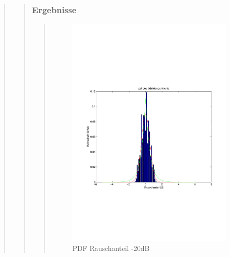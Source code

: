 \begin{quote}
\begin{quote}
        \subsubsection{Ergebnisse}
		\begin{quote}
		
		\begin{figure}[H]
        \centering
            \includegraphics[scale=0.6, trim = 1cm 6.5cm 1cm 7.5cm, clip]{./Bilder/PDFRauschen-20dB}
                \caption{PDF Rauschanteil -20dB}
        \end{figure}
        

\end{quote}
\end{quote}
\end{quote}
